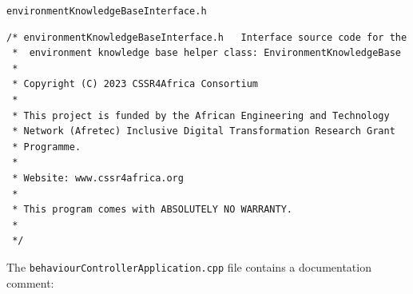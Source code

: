 \documentclass{CSSRforAfrica}
\newcommand{\blank}{~\\}
\newcommand{\checkboxChecked}{\fbox{\ding{51}}} %
\begin{document}
\begin{description}
{\begin{verbatim}
\end{verbatim} }

\item[\checkboxChecked] {\small \verb+environmentKnowledgeBaseInterface.h+}   
{\small \begin{verbatim}
/* environmentKnowledgeBaseInterface.h   Interface source code for the 
 *  environment knowledge base helper class: EnvironmentKnowledgeBase
 *
 * Copyright (C) 2023 CSSR4Africa Consortium
 *
 * This project is funded by the African Engineering and Technology
 * Network (Afretec) Inclusive Digital Transformation Research Grant
 * Programme.
 *
 * Website: www.cssr4africa.org
 *
 * This program comes with ABSOLUTELY NO WARRANTY.
 *
 */
\end{verbatim} }

\end{description} 
%

\noindent The {\small \verb+behaviourControllerApplication.cpp+} file contains a documentation comment:
\end{document}
